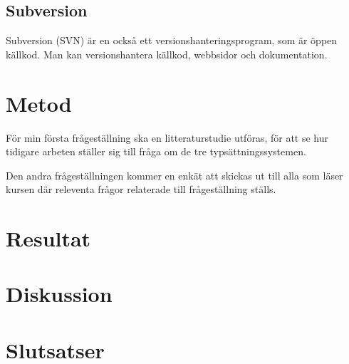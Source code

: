 \subsection{Subversion}
Subversion (SVN) är en också ett versionshanteringsprogram, som är öppen källkod. Man kan versionshantera källkod, webbsidor och dokumentation. 

\section{Metod}
\label{sec:method-tuhkala}

För min första frågeställning ska en litteraturstudie utföras, för att se hur tidigare arbeten ställer sig till fråga om de tre typsättningssystemen.

Den andra frågeställningen kommer en enkät att skickas ut till alla som läser kursen där releventa frågor relaterade till frågeställning ställs.

\section{Resultat}
\label{sec:results-tuhkala}


\section{Diskussion}
\label{sec:discussion-tuhkala}



\section{Slutsatser}
\label{sec:conclusions-tuhkala}


